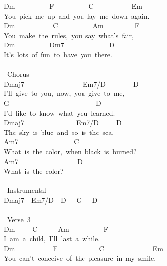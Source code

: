 {Dm\ \ \ \ \ \ \ \ \ \ F\ \ \ \ \ \ \ \ \ \ C\ \ \ \ \ \ \ \ \ \ \ Em\\
You\ pick\ me\ up\ and\ you\ lay\ me\ down\ again.\ \\
Dm\ \ \ \ \ \ \ \ \ \ \ C\ \ \ \ \ \ \ \ \ \ Am\ \ \ \ \ \ \ \ \ F\ \\
You\ make\ the\ rules,\ you\ say\ what's\ fair,\ \\
Dm\ \ \ \ \ \ \ \ \ \ Dm7\ \ \ \ \ \ \ \ \ \ \ \ \ D\\
It's\ lots\ of\ fun\ to\ have\ you\ there.\ \\
\\
\lbrack\ Chorus\rbrack\\
Dmaj7\ \ \ \ \ \ \ \ \ \ \ \ \ \ \ \ \ Em7/D\ \ \ \ \ \ \ \ D\ \\
I'll\ give\ to\ you,\ now,\ you\ give\ to\ me,\ \\
G\ \ \ \ \ \ \ \ \ \ \ \ \ \ \ \ \ \ \ \ \ \ \ \ \ D\ \\
I'd\ like\ to\ know\ what\ you\ learned.\ \\
Dmaj7\ \ \ \ \ \ \ \ \ \ \ \ \ \ \ Em7/D\ \ \ \ \ D\ \\
The\ sky\ is\ blue\ and\ so\ is\ the\ sea.\ \\
Am7\ \ \ \ \ \ \ \ \ \ \ \ \ \ \ \ C\ \\
What\ is\ the\ color,\ when\ black\ is\ burned?\ \\
Am7\ \ \ \ \ \ \ \ \ \ \ \ \ \ \ \ \ D\ \\
What\ is\ the\ color?\\
\\
\lbrack\ Instrumental\rbrack\\
Dmaj7\ \ Em7/D\ \ D\ \ \ G\ \ \ D\\
\\
\lbrack\ Verse\ 3\rbrack\ \\
Dm\ \ \ \ \ C\ \ \ \ \ \ Am\ \ \ \ \ \ \ \ \ \ F\ \\
I\ am\ a\ child,\ I'll\ last\ a\ while.\ \\
Dm\ \ \ \ \ \ \ \ \ \ \ F\ \ \ \ \ \ \ \ \ \ \ \ C\ \ \ \ \ \ \ \ \ \ \ \ \ \ Em\ \\
You\ can't\ conceive\ of\ the\ pleasure\ in\ my\ smile.\ }
